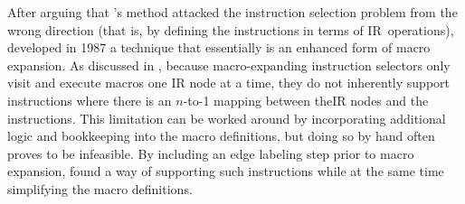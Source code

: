 After arguing that \citeauthor{GlanvilleGraham:1978}'s method attacked the
\gls{instruction selection} problem from the wrong direction (that is, by
defining the \glspl{instruction} in terms of \gls{IR}~operations),
\textcite{Horspool:1987} developed in 1987 a technique that essentially is an
enhanced form of \gls{macro expansion}.
%
As discussed in , because \gls{macro}-expanding
\glspl{instruction selector} only visit and execute macros one \gls{IR}
\gls{node} at a time, they do not inherently support \glspl{instruction} where
there is an \mbox{$n$-to-1} mapping between the\gls{IR} \glspl{node} and the
\glspl{instruction}.
%
This limitation can be worked around by incorporating additional logic and
bookkeeping into the macro definitions, but doing so by hand often proves to be
infeasible.
%
By including an \gls{edge} labeling step prior to \gls{macro expansion},
\citeauthor{Horspool:1987} found a way of supporting such \glspl{instruction}
while at the same time simplifying the \gls{macro} definitions.

